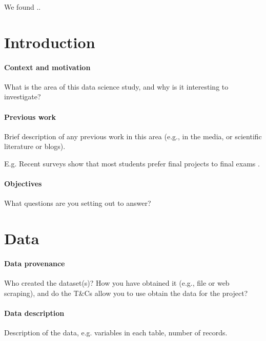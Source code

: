 \documentclass[11pt,a4paper]{article}
\begin{document}
        We found ..

    \section{Introduction}

        \paragraph{Context and motivation}

            What is the area of this data science study, and why is it interesting to
                investigate?

        \paragraph{Previous work}

            Brief description of any previous work in this area (e.g., in the media, or
                scientific literature or blogs).

            E.g. Recent surveys show that most students prefer final projects to final
                exams \cite{Space2021}.

        \paragraph{Objectives}

            What questions are you setting out to answer?

    \section{Data}

        \paragraph{Data provenance}
            Who created the dataset(s)?
            How you have obtained it (e.g., file or web scraping), and do the T\&Cs allow
                you to use obtain the data for the project?

        \paragraph{Data description}
            Description of the data, e.g. variables in each table, number of records.
\end{document}
